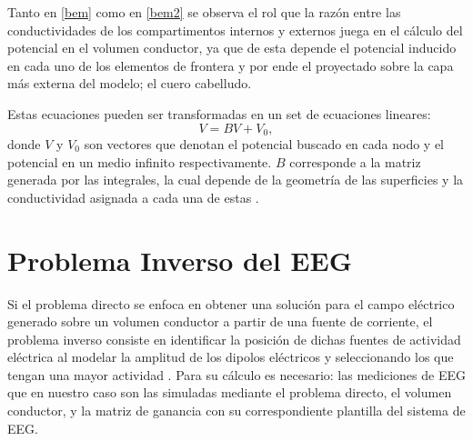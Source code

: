 Tanto en \cref{bem} como en \cref{bem2} se observa el rol que la razón entre las conductividades de los compartimentos internos y externos juega en el cálculo del potencial en el volumen conductor, ya que de esta depende el potencial inducido en cada uno de los elementos de frontera y por ende el proyectado sobre la capa más externa del modelo; el cuero cabelludo.

Estas ecuaciones pueden ser transformadas en un set de ecuaciones lineares:
\begin{equation}
	\label{lineal}
	V = BV + V_{0},
\end{equation}
donde $V$ y $V_{0}$ son vectores que denotan el potencial buscado en cada nodo y el potencial en un medio infinito respectivamente.
$B$ corresponde a la matriz generada por las integrales, la cual depende de la geometría de las superficies y la conductividad asignada a cada una de estas \cite{Hallez2007}.

\section{Problema Inverso del EEG}
\label{sec:intro:inverse}

Si el problema directo se enfoca en obtener una solución para el campo eléctrico generado sobre un volumen conductor a partir de una fuente de corriente, el problema inverso consiste en identificar la posición de dichas fuentes de actividad eléctrica al modelar la amplitud de los dipolos eléctricos y seleccionando los que tengan una mayor actividad \cite{Baillet2001}.
Para su cálculo es necesario: las mediciones de EEG que en nuestro caso son las simuladas mediante el problema directo, el volumen conductor, y la matriz de ganancia con su correspondiente plantilla del sistema de EEG.

